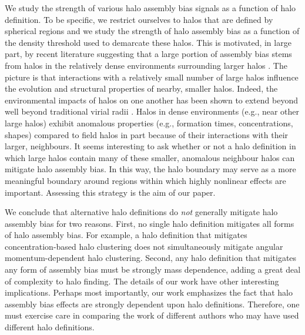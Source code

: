 \documentclass[usenatbib,fleqn]{mnras}
\begin{document}
We study the strength of various halo assembly bias signals as a function of halo definition. To be specific, we restrict ourselves to halos that are defined by spherical regions and we study the strength of halo assembly bias as a function of the density threshold used to demarcate these halos. This is motivated, in large part, by recent literature suggesting that a large portion of assembly bias stems from halos in the relatively dense environments surrounding larger halos \citep{wang_etal07,warnick_etal08,more_etal15,sunayama_etal16}. The picture is that interactions with a relatively small number of large halos influence the evolution and structural properties of nearby, smaller halos. Indeed, the environmental impacts of halos on one another has been shown to extend beyond well beyond traditional 
virial radii \citep{wetzel_etal14,diemer_kravtsov14,behroozi_etal14,adhikari_etal14,wetzel_nagai15,more_etal15}. Halos in dense environments (e.g., near other large halos) exhibit anomalous properties (e.g., formation times, concentrations, shapes) compared to field halos in part because of their interactions with their larger, neighbours. It seems interesting to ask whether or not a halo definition in which large halos contain many of these smaller, anomalous neighbour halos can mitigate halo assembly bias. In this way, the halo boundary may serve as a more meaningful boundary around regions within which highly nonlinear effects are important. 
 Assessing this strategy is the aim of our paper. 

We conclude that alternative halo definitions do {\em not} generally mitigate halo assembly bias for two reasons. First, no single halo definition mitigates all forms of halo assembly bias. For example, a halo definition that mitigates concentration-based halo clustering does not simultaneously mitigate angular momentum-dependent halo clustering. Second, any halo definition that mitigates any form  of assembly bias must be strongly mass dependence, adding a great deal of complexity to halo finding. The details of our work have other interesting implications. Perhaps most importantly, 
our work emphasizes the fact that halo assembly bias effects are strongly dependent upon halo definitions. Therefore, one must exercise care in comparing the work of different authors who may have used different halo definitions.
 
\end{document}
